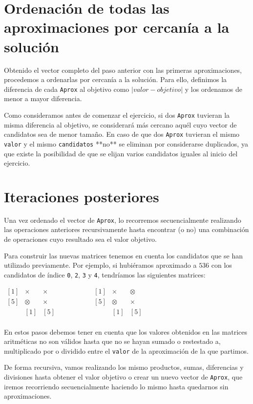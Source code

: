 \section{Ordenación de todas las aproximaciones por cercanía a la solución}

Obtenido el vector completo del paso anterior con las primeras aproximaciones, procedemos a ordenarlas por cercanía a la solución.
Para ello, definimos la diferencia de cada \texttt{Aprox} al objetivo como $|valor-objetivo|$ y los ordenamos de menor a mayor diferencia.

\pagebreak

Como consideramos antes de comenzar el ejercicio, si dos \texttt{Aprox} tuvieran la misma diferencia al objetivo, se considerará más cercano aquél cuyo vector de candidatos sea de menor tamaño.
En caso de que dos \texttt{Aprox} tuvieran el mismo \texttt{valor} y el mismo \texttt{candidatos} **no** se eliminan por considerarse duplicados, ya que existe la posibilidad de que se elijan varios candidatos iguales al inicio del ejercicio.

\section{Iteraciones posteriores}

Una vez ordenado el vector de \texttt{Aprox}, lo recorremos secuencialmente realizando las operaciones anteriores recursivamente hasta encontrar (o no) una combinación de operaciones cuyo resultado sea el valor objetivo.

Para construir las nuevas matrices tenemos en cuenta los candidatos que se han utilizado previamente.
Por ejemplo, si hubiéramos aproximado a $536$ con los candidatos de índice \texttt{0}, \texttt{2}, \texttt{3} y \texttt{4}, tendríamos las siguientes matrices:

\begin{center}
$\begin{matrix}
[1] & \times  & \times \\
[5] & \otimes & \times \\
    &   [1]   &   [5]  \\
\end{matrix}
\ \ \ \ \ \ \ \ \ \ \ \ \ \ \ \ \ \ \ \ \ \ \begin{matrix}
[1] & \times  & \otimes \\
[5] & \otimes & \times  \\
    &   [1]   &    [5]  \\
\end{matrix}$
\end{center}

En estos pasos debemos tener en cuenta que los valores obtenidos en las matrices aritméticas no son válidos hasta que no se hayan sumado o restestado a, multiplicado por o dividido entre el \texttt{valor} de la aproximación de la que partimos.

De forma recursiva, vamos realizando los mismo productos, sumas, diferencias y divisiones hasta obtener el valor objetivo o crear un nuevo vector de \texttt{Aprox}, que iremos recorriendo secuencialmente haciendo lo mismo hasta quedarnos sin aproximaciones.
